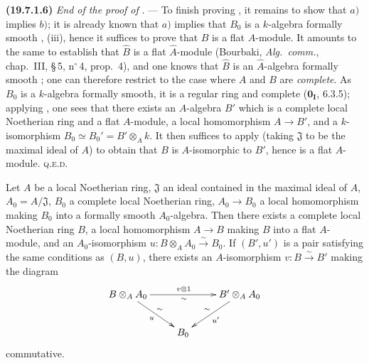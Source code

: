 \medskip
\noindent\textbf{(19.7.1.6)}\enspace
\emph{End of the proof of} . ---
To finish proving , it remains to show that $a)$ implies $b)$; it is already known that $a)$ implies that $B_0$ is a $k$-algebra formally smooth , (iii), hence it suffices to prove that $B$ is a flat $A$-module.
It amounts to the same to establish that $\widehat{B}$ is a flat $\widehat{A}$-module (Bourbaki, \emph{Alg.\ comm.}, chap.~III, \S\,5, n$^\circ$\,4, prop.~4), and one knows that $\widehat{B}$ is an $\widehat{A}$-algebra formally smooth ; one can therefore restrict to the case where $A$ and $B$ are \emph{complete}.
As $B_0$ is a $k$-algebra formally smooth, it is a regular ring  and complete ($\mathbf{0_I}$, 6.3.5); applying , one sees that there exists an $A$-algebra $B'$ which is a complete local Noetherian ring and a flat $A$-module, a local homomorphism $A\to B'$, and a $k$-isomorphism $B_0\simeq B_0'=B'\otimes_A k$.
It then suffices to apply  (taking $\mathfrak{J}$ to be the maximal ideal of $A$) to obtain that $B$ is $A$-isomorphic to $B'$, hence is a flat $A$-module. \textsc{q.e.d.}

\begin{theorem}[19.7.2]
\label{0.19.7.2}
Let $A$ be a local Noetherian ring, $\mathfrak{J}$ an ideal contained in the maximal ideal of $A$, $A_0=A/\mathfrak{J}$, $B_0$ a complete local Noetherian ring, $A_0\to B_0$ a local homomorphism making $B_0$ into a formally smooth $A_0$-algebra.
Then there exists a complete local Noetherian ring $B$, a local homomorphism $A\to B$ making $B$ into a flat $A$-module, and an $A_0$-isomorphism $u:B\otimes_A A_0\xrightarrow{\sim} B_0$.
If $(B',u')$ is a pair satisfying the same conditions as $(B,u)$, there exists an $A$-isomorphism $v:B\xrightarrow{\sim} B'$ making the diagram
\[
\xymatrix{
  B\otimes_A A_0 \ar[rr]^{v\otimes 1}_{\sim} \ar[dr]^{\sim}_u && B'\otimes_A A_0 \ar[dl]^{u'}_{\sim} \\
  & B_0
}
\]
commutative.
\end{theorem}

